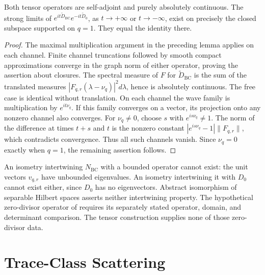 \begin{proposition}
\label{v4-arith:w7-j:prop:tensor-wave-obstruction}
Both tensor operators are self-adjoint and purely absolutely
continuous. The strong limits of
\(e^{it\widetilde D_{\mathrm{BC}}}e^{-it\widetilde D_0}\), as
\(t\to+\infty\) or \(t\to-\infty\), exist on precisely the
closed subspace supported on \(q=1\). They equal the identity there.
\end{proposition}
\begin{proof}
The maximal multiplication argument in the preceding lemma applies
on each channel. Finite channel truncations followed by smooth
compact approximations converge in the graph norm of either
operator, proving the assertion about closures. The spectral measure
of \(F\) for \(\widetilde D_{\mathrm{BC}}\) is the sum of the translated
measures \(|F_{q,r}(\lambda-\nu_q)|^2d\lambda\), hence is absolutely
continuous. The free case is identical without translation.
On each channel the wave family is multiplication by
\(e^{it\nu_q}\). If this family converges on a vector, its projection
onto any nonzero channel also converges. For \(\nu_q\ne0\), choose
\(s\) with \(e^{is\nu_q}\ne1\). The norm of the difference at times
\(t+s\) and \(t\) is the nonzero constant
\(|e^{is\nu_q}-1|\|F_{q,r}\|\), which contradicts convergence.
Thus all such channels vanish. Since \(\nu_q=0\) exactly when
\(q=1\), the remaining assertion follows.
\end{proof}

\begin{remark}
\label{v4-arith:w7-j:rem:relation-to-HHP}
An isometry intertwining \(N_{\mathrm{BC}}\) with a bounded operator
cannot exist: the unit vectors \(v_{q,r}\) have unbounded eigenvalues.
An isometry intertwining it with \(D_0\) cannot exist either,
since \(D_0\) has no eigenvectors. Abstract isomorphism of separable
Hilbert spaces asserts neither intertwining property.
The hypothetical zero-divisor operator of
 requires its separately stated
operator, domain, and determinant comparison. The tensor
construction supplies none of those zero-divisor data.
\end{remark}

\section{Trace-Class Scattering}
\label{v4-arith:w7-j:framework:S-matrix}
\label{v4-arith:w7-j:reformulation}
\label{v4-arith:w7-j:reformulation:birman-krein}

